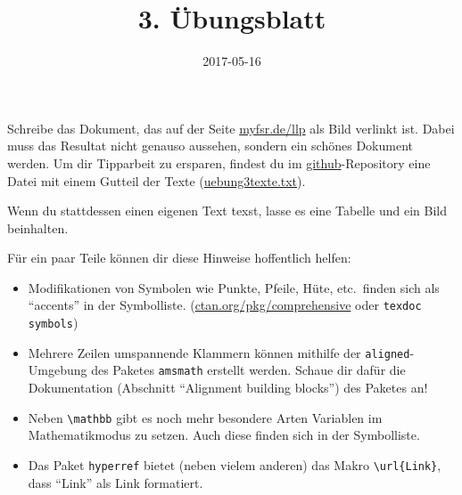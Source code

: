 \documentclass{latex-htw-uebung}
\title{3. Übungsblatt}
\date{2017-05-16}
\begin{document}
Schreibe das Dokument, das auf der Seite \url{myfsr.de/llp} als Bild verlinkt ist. Dabei muss das Resultat nicht genauso aussehen, sondern ein schönes Dokument werden. Um dir Tipparbeit zu ersparen, findest du im \url{github}-Repository eine Datei mit einem Gutteil der Texte (\url{uebung3texte.txt}).

Wenn du stattdessen einen eigenen Text texst, lasse es eine Tabelle und ein Bild beinhalten.

Für ein paar Teile können dir diese Hinweise hoffentlich helfen:
\begin{itemize}
  \item Modifikationen von Symbolen wie Punkte, Pfeile, Hüte, etc.\ finden sich als \enquote{accents} in der Symbolliste. (\url{ctan.org/pkg/comprehensive} oder \lstinline!texdoc symbols!)
  \item Mehrere Zeilen umspannende Klammern können mithilfe der \lstinline!aligned!-Umgebung des Paketes \lstinline!amsmath! erstellt werden. Schaue dir dafür die Dokumentation (Abschnitt \enquote{Alignment building blocks}) des Paketes an!
  \item Neben \lstinline!\mathbb! gibt es noch mehr besondere Arten Variablen im Mathematikmodus zu setzen. Auch diese finden sich in der Symbolliste.
  \item Das Paket \lstinline!hyperref! bietet (neben vielem anderen) das Makro \lstinline!\url{Link}!, dass \enquote{Link} als Link formatiert.
\end{itemize}
\end{document}
